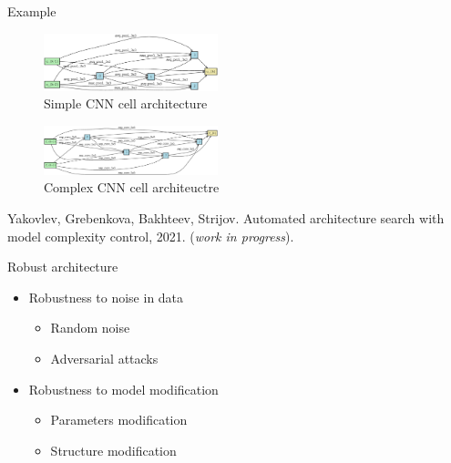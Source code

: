 \documentclass[usenames,dvipsnames,11pt,pdf,utf8,russian,aspectratio=169]{beamer}
\begin{document}
\begin{frame}{Example}
\vspace{-0.5cm}
\begin{multicols}{2}
\begin{figure}[h]
\includegraphics[width=0.45\textwidth]{./geno_2.eps}
\caption*{Simple CNN cell architecture}
\end{figure}

\begin{figure}[h]
\includegraphics[width=0.45\textwidth]{./geno_1.eps}
\caption*{Complex CNN cell architeuctre}
\end{figure}
\end{multicols}
\vspace{-0.5cm}
{\footnotesize Yakovlev, Grebenkova, Bakhteev, Strijov. Automated architecture search with model complexity control, 2021. (\textit{work in progress}).}
\end{frame}
 




\begin{frame}{Robust architecture}
\begin{itemize}
\item Robustness to noise in data
\begin{itemize}
\item Random noise
\item Adversarial attacks
\end{itemize}
\item Robustness to model modification
\begin{itemize}
\item Parameters modification
\item Structure modification
\end{itemize}
\end{itemize}
\end{frame}
\end{document}
